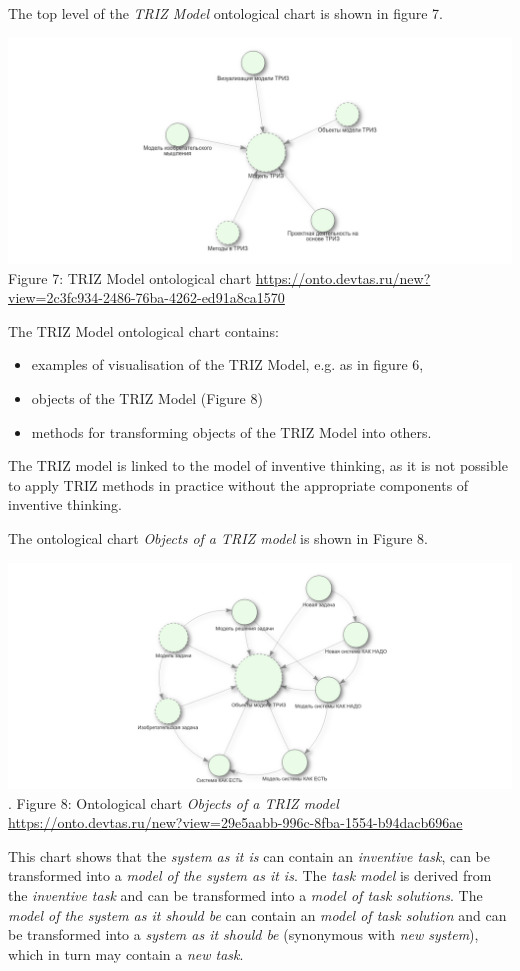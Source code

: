 \documentclass[11pt,a4paper]{article}
\begin{document}
The top level of the \emph{TRIZ Model} ontological chart is shown in figure 7.
\begin{center}
  \includegraphics[width=.8\textwidth]{7.png}\\
  Figure 7: TRIZ Model ontological chart
  \url{https://onto.devtas.ru/new?view=2c3fc934-2486-76ba-4262-ed91a8ca1570}
\end{center}
The TRIZ Model ontological chart contains:
\begin{itemize}[noitemsep]
\item examples of visualisation of the TRIZ Model, e.g. as in figure 6,
\item objects of the TRIZ Model (Figure 8)
\item methods for transforming objects of the TRIZ Model into others.
\end{itemize}
The TRIZ model is linked to the model of inventive thinking, as it is not
possible to apply TRIZ methods in practice without the appropriate components
of inventive thinking.

The ontological chart \emph{Objects of a TRIZ model} is shown in Figure 8.

\begin{center}
  \includegraphics[width=.8\textwidth]{8.png}\\.
  Figure 8: Ontological chart \emph{Objects of a TRIZ model}
  \url{https://onto.devtas.ru/new?view=29e5aabb-996c-8fba-1554-b94dacb696ae} 
\end{center}
This chart shows that the \emph{system as it is} can contain an
\emph{inventive task}, can be transformed into a \emph{model of the system as
  it is}.  The \emph{task model} is derived from the \emph{inventive task} and
can be transformed into a \emph{model of task solutions}. The \emph{model of
  the system as it should be} can contain an \emph{model of task solution} and
can be transformed into a \emph{system as it should be} (synonymous with
\emph{new system}), which in turn may contain a \emph{new task}.
\end{document}
